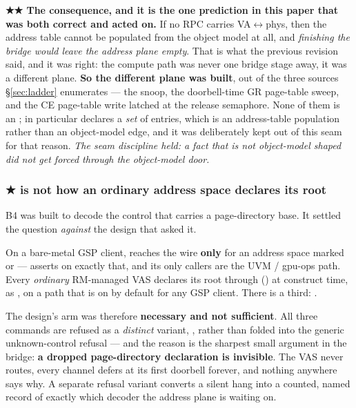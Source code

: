 \documentclass[10.5pt]{article}
\begin{document}
\textbf{★★ The consequence, and it is the one prediction in this paper that was both correct and
acted on.} If no RPC carries VA$\leftrightarrow$phys, then the address table cannot be populated
from the object model at all, and \emph{finishing the bridge would leave the address plane empty}.
That is what the previous revision said, and it was right: the compute path was never one bridge
stage away, it was a different plane. \textbf{So the different plane was built}, out of the three
sources \S\ref{sec:ladder} enumerates — the  snoop, the doorbell-time GR
page-table sweep, and the CE page-table write latched at the release semaphore. None of them is an
;  in particular declares a \emph{set} of
 entries, which is an address-table population
rather than an object-model edge, and it was deliberately kept out of this seam for that reason.
\emph{The seam discipline held: a fact that is not object-model shaped did not get forced through
the object-model door.}

\subsubsection*{\texorpdfstring{★  is not how an ordinary address space declares its root}{SET_PAGE_DIRECTORY is not how an ordinary address space declares its root}}

B4 was built to decode the control that carries a page-directory base. It settled the question
\emph{against} the design that asked it.

On a bare-metal GSP client,  reaches the wire \textbf{only} for an
address space marked  or  —
 asserts on exactly that, and its only callers are the
UVM / gpu-ops path. Every \emph{ordinary} RM-managed VAS declares its root through
() at construct time, as , on a path that is on by
default for any GSP client. There is a third:
.

The design's arm was therefore \textbf{necessary and not sufficient}. All three commands are
refused as a \emph{distinct} variant, , rather than folded
into the generic unknown-control refusal — and the reason is the sharpest small argument in the
bridge: \textbf{a dropped page-directory declaration is invisible}. The VAS never routes, every
channel defers at its first doorbell forever, and nothing anywhere says why. A separate refusal
variant converts a silent hang into a counted, named record of exactly which decoder the address
plane is waiting on.
\end{document}
